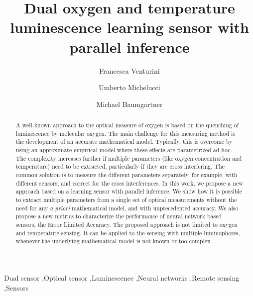 \documentclass[final,5p,times,twocolumn]{elsarticle}
\begin{document}
\begin{frontmatter}

\title{Dual oxygen and temperature luminescence learning sensor with parallel inference}

\author[zhaw,toelt]{Francesca Venturini}
\author[toelt]{Umberto Michelucci}
\author[zhaw]{Michael Baumgartner}


\address[zhaw]{Institute of Applied Mathematics and Physics, Zurich University of Applied Sciences, Technikumstrasse 9, 8401 Winterthur, Switzerland}
\address[toelt]{TOELT llc, Birchlenstr. 25, 8600 D\"ubendorf}



\begin{abstract}
A well-known approach to the optical measure of oxygen is based on the quenching of luminescence by molecular oxygen. The main challenge for this measuring method is the development of an accurate mathematical model. Typically, this is overcome by using an approximate empirical model where these effects are parametrized ad hoc. The complexity increases further if multiple parameters (like oxygen concentration and temperature) need to be extracted, particularly if they are cross interfering. The common solution is to measure the different parameters separately, for example, with different sensors, and correct for the cross interferences.
In this work, we propose a new approach based on a learning sensor with parallel inference. We show how it is possible to extract multiple parameters from a single set of optical measurements without the need for any {\sl a priori} mathematical model, and with unprecedented accuracy. We also propose a new metrics to characterize the performance of neural network based sensors, the Error Limited Accuracy. The proposed approach is not limited to oxygen and temperature sensing. It can be applied to the sensing with multiple luminophores, whenever the underlying mathematical model is not known or too complex.
\end{abstract}


\begin{keyword}
Dual sensor \sep Optical sensor \sep Luminescence \sep Neural networks \sep Remote sensing \sep Sensors


\end{keyword}

\end{frontmatter}
\end{document}
